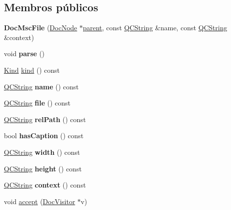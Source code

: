 \subsection*{Membros públicos}
\begin{DoxyCompactItemize}
\item 
\hypertarget{class_doc_msc_file_ae0eea7aca4ada6762b37e4c5092c8c9c}{{\bfseries Doc\-Msc\-File} (\hyperlink{class_doc_node}{Doc\-Node} $\ast$\hyperlink{class_doc_node_abd7f070d6b0a38b4da71c2806578d19d}{parent}, const \hyperlink{class_q_c_string}{Q\-C\-String} \&name, const \hyperlink{class_q_c_string}{Q\-C\-String} \&context)}\label{class_doc_msc_file_ae0eea7aca4ada6762b37e4c5092c8c9c}

\item 
\hypertarget{class_doc_msc_file_ad7c704b34912678d95c13243cacf9d7f}{void {\bfseries parse} ()}\label{class_doc_msc_file_ad7c704b34912678d95c13243cacf9d7f}

\item 
\hyperlink{class_doc_node_aa10c9e8951b8ccf714a59ec321bdac5b}{Kind} \hyperlink{class_doc_msc_file_aa9d037bed9f9a083d0cd01485637d843}{kind} () const 
\item 
\hypertarget{class_doc_msc_file_af92302878527ec555ba9e3fe066925ff}{\hyperlink{class_q_c_string}{Q\-C\-String} {\bfseries name} () const }\label{class_doc_msc_file_af92302878527ec555ba9e3fe066925ff}

\item 
\hypertarget{class_doc_msc_file_aeaa8cdb0fbabc1058b7d3813f2fd223b}{\hyperlink{class_q_c_string}{Q\-C\-String} {\bfseries file} () const }\label{class_doc_msc_file_aeaa8cdb0fbabc1058b7d3813f2fd223b}

\item 
\hypertarget{class_doc_msc_file_a3aa6799d4713d51d9cc4862af165671c}{\hyperlink{class_q_c_string}{Q\-C\-String} {\bfseries rel\-Path} () const }\label{class_doc_msc_file_a3aa6799d4713d51d9cc4862af165671c}

\item 
\hypertarget{class_doc_msc_file_a47d6a6a9de9fe305f0a40bc7ab568e28}{bool {\bfseries has\-Caption} () const }\label{class_doc_msc_file_a47d6a6a9de9fe305f0a40bc7ab568e28}

\item 
\hypertarget{class_doc_msc_file_a3b2930dfedd2909fb77430aee4aba6fa}{\hyperlink{class_q_c_string}{Q\-C\-String} {\bfseries width} () const }\label{class_doc_msc_file_a3b2930dfedd2909fb77430aee4aba6fa}

\item 
\hypertarget{class_doc_msc_file_ab6aa5410ea982fcf57c2dbb7e9701858}{\hyperlink{class_q_c_string}{Q\-C\-String} {\bfseries height} () const }\label{class_doc_msc_file_ab6aa5410ea982fcf57c2dbb7e9701858}

\item 
\hypertarget{class_doc_msc_file_a4d6bb4ed13678cf22ef5cb414076d9f5}{\hyperlink{class_q_c_string}{Q\-C\-String} {\bfseries context} () const }\label{class_doc_msc_file_a4d6bb4ed13678cf22ef5cb414076d9f5}

\item 
void \hyperlink{class_doc_msc_file_a7ba716e854ae2f8f87a4eb2140e302b6}{accept} (\hyperlink{class_doc_visitor}{Doc\-Visitor} $\ast$v)
\end{DoxyCompactItemize}

